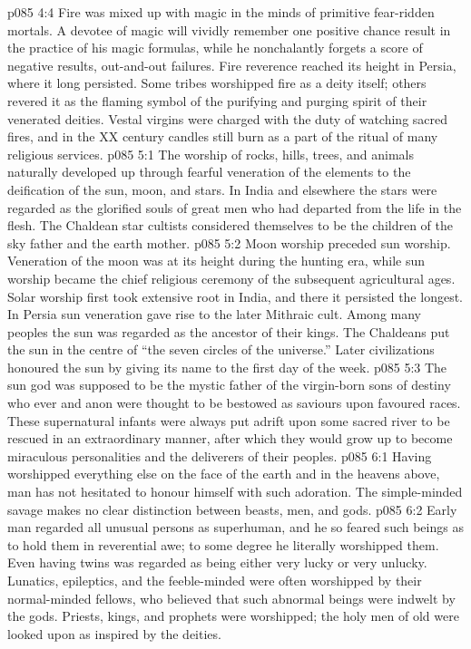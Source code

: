 \vs p085 4:4 Fire was mixed up with magic in the minds of primitive fear\hyp{}ridden mortals. A devotee of magic will vividly remember one positive chance result in the practice of his magic formulas, while he nonchalantly forgets a score of negative results, out\hyp{}and\hyp{}out failures. Fire reverence reached its height in Persia, where it long persisted. Some tribes worshipped fire as a deity itself; others revered it as the flaming symbol of the purifying and purging spirit of their venerated deities. Vestal virgins were charged with the duty of watching sacred fires, and in the XX century candles still burn as a part of the ritual of many religious services.
\vs p085 5:1 The worship of rocks, hills, trees, and animals naturally developed up through fearful veneration of the elements to the deification of the sun, moon, and stars. In India and elsewhere the stars were regarded as the glorified souls of great men who had departed from the life in the flesh. The Chaldean star cultists considered themselves to be the children of the sky father and the earth mother.
\vs p085 5:2 Moon worship preceded sun worship. Veneration of the moon was at its height during the hunting era, while sun worship became the chief religious ceremony of the subsequent agricultural ages. Solar worship first took extensive root in India, and there it persisted the longest. In Persia sun veneration gave rise to the later Mithraic cult. Among many peoples the sun was regarded as the ancestor of their kings. The Chaldeans put the sun in the centre of “the seven circles of the universe.” Later civilizations honoured the sun by giving its name to the first day of the week.
\vs p085 5:3 The sun god was supposed to be the mystic father of the virgin\hyp{}born sons of destiny who ever and anon were thought to be bestowed as saviours upon favoured races. These supernatural infants were always put adrift upon some sacred river to be rescued in an extraordinary manner, after which they would grow up to become miraculous personalities and the deliverers of their peoples.
\vs p085 6:1 Having worshipped everything else on the face of the earth and in the heavens above, man has not hesitated to honour himself with such adoration. The simple\hyp{}minded savage makes no clear distinction between beasts, men, and gods.
\vs p085 6:2 Early man regarded all unusual persons as superhuman, and he so feared such beings as to hold them in reverential awe; to some degree he literally worshipped them. Even having twins was regarded as being either very lucky or very unlucky. Lunatics, epileptics, and the feeble\hyp{}minded were often worshipped by their normal\hyp{}minded fellows, who believed that such abnormal beings were indwelt by the gods. Priests, kings, and prophets were worshipped; the holy men of old were looked upon as inspired by the deities.
